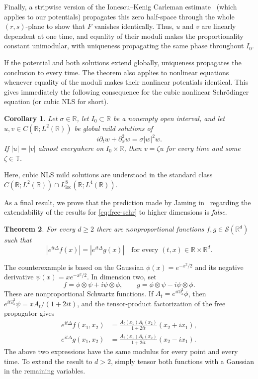 \documentclass[11pt]{amsart}
\newtheorem{mainresult}{Theorem}
\newtheorem{maincorollary}[mainresult]{Corollary}
\theoremstyle{remark}
\newcommand{\R}{\mathbb R}
\newcommand{\T}{\mathbb T}
\newcommand{\Sc}{\mathcal S}
\newcommand{\1}{\mathbf 1}
\newcommand{\loc}{\mathrm{loc}}
\begin{document}
Finally, a stripwise version of the Ionescu--Kenig Carleman estimate~\cite{IonescuKenig} (which applies to our potentials) propagates this zero half-space through the whole $(r,s)$-plane to show that $F$ vanishes identically. Thus, $u$ and $v$ are linearly dependent at one time, and equality of their moduli makes the proportionality constant unimodular, with uniqueness propagating the same phase throughout $I_0$.

If the potential and both solutions extend globally, uniqueness propagates the conclusion to every time.  The theorem also applies to nonlinear equations whenever equality of the moduli makes their nonlinear potentials
identical. This gives immediately the following consequence for the cubic nonlinear Schr\"odinger equation (or cubic NLS for short).

\begin{maincorollary}
\label{cor:cubic-NLS}
Let $\sigma\in\R$, let $I_0\subset\R$ be a nonempty open interval, and let
$u,v\in C(\R;L^2(\R))$ be global mild solutions of
\[
i\partial_t w+\partial_x^2w=\sigma|w|^2w.
\]
If $|u|=|v|$ almost everywhere on $I_0\times\R$, then
$v=\zeta u$ for every time and some $\zeta\in\T$.
\end{maincorollary}
Here, cubic NLS mild solutions are understood in the standard class
$C(\R;L^2(\R))\cap L^8_{\loc}(\R;L^4(\R))$.

As a final result, we prove that the prediction made by Jaming in~\cite{Jaming2025} regarding the extendability of the results for \eqref{eq:free-schr} to higher dimensions is \emph{false}.
\begin{mainresult}
\label{thm:higher-dimensional-failure}
For every $d\ge2$ there are nonproportional functions
$f,g\in\Sc(\R^d)$ such that
\[
 |e^{it\Delta}f(x)|=|e^{it\Delta}g(x)|
 \quad\text{for every }(t,x)\in\R\times\R^d.
\]
\end{mainresult}

The counterexample is based on the Gaussian $\phi(x)=e^{-x^2/2}$ and its negative derivative $\psi(x)=xe^{-x^2/2}$. In dimension two, set
\[
 f=\phi\otimes\psi+i\psi\otimes\phi,
 \qquad
 g=\phi\otimes\psi-i\psi\otimes\phi.
\]
These are nonproportional Schwartz functions. If $A_t=e^{it\partial_x^2}\phi$, then $e^{it\partial_x^2}\psi=xA_t/(1+2it)$, and the tensor-product factorization of the free propagator gives
\begin{align*}
 e^{it\Delta}f(x_1,x_2)
 &=\frac{A_t(x_1)A_t(x_2)}{1+2it}(x_2+ix_1),\\
 e^{it\Delta}g(x_1,x_2)
 &=\frac{A_t(x_1)A_t(x_2)}{1+2it}(x_2-ix_1).
\end{align*}
The above two expressions have the same modulus for every point and every time. To extend the result to $d>2$, simply tensor both functions with a Gaussian in the remaining variables.
\\
\end{document}
